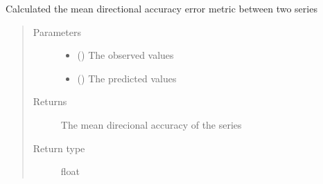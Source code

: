 \documentclass[letterpaper,10pt,english]{sphinxmanual}
\begin{document}
\begin{fulllineitems}
\label{\detokenize{index:Src.utils.mean_directional_accuracy}}
Calculated the mean directional accuracy
error metric between two series
\begin{quote}\begin{description}
\item[{Parameters}] \leavevmode\begin{itemize}
\item {} 
 () \textendash{} The observed values

\item {} 
 () \textendash{} The predicted values

\end{itemize}

\item[{Returns}] \leavevmode
The mean direcional accuracy of the series

\item[{Return type}] \leavevmode
float

\end{description}\end{quote}

\end{fulllineitems}

\end{document}
